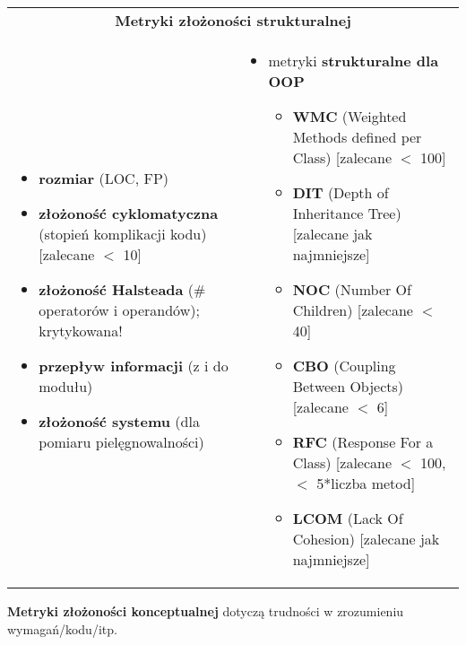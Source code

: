 \documentclass[../main.tex]{subfiles}
\begin{document}
    \begin{table}[H]
        \begin{center}
            \begin{tabular}{p{8cm} p{8cm}}
                \multicolumn{2}{c}{  \textbf{Metryki złożoności strukturalnej}}\\
                \begin{itemize}
                    \item \textbf{rozmiar} (LOC, FP)
                    \item \textbf{złożoność cyklomatyczna} (stopień komplikacji kodu) [zalecane $<$ 10]
                    \item \textbf{złożoność Halsteada} (\# operatorów i operandów); krytykowana!
                    \item \textbf{przepływ informacji} (z i do modułu)
                    \item \textbf{złożoność systemu} (dla pomiaru pielęgnowalności)
                \end{itemize}
                &
                \begin{itemize}
                    \item metryki \textbf{strukturalne dla OOP}
                    \begin{itemize}
                        \item \textbf{WMC} (Weighted Methods defined per Class) [zalecane $<$ 100]
                        \item \textbf{DIT} (Depth of Inheritance Tree) [zalecane jak najmniejsze]
                        \item \textbf{NOC} (Number Of Children) [zalecane $<$ 40]
                        \item \textbf{CBO} (Coupling Between Objects) [zalecane $<$ 6]
                        \item \textbf{RFC} (Response For a Class) [zalecane $<$ 100, $<$ 5*liczba metod]
                        \item \textbf{LCOM} (Lack Of Cohesion) [zalecane jak najmniejsze]
                    \end{itemize}
                \end{itemize}\\
            \end{tabular}
        \end{center}
    \end{table}

    \textbf{Metryki złożoności konceptualnej} dotyczą trudności w zrozumieniu wymagań/kodu/itp.\\
\end{document}
